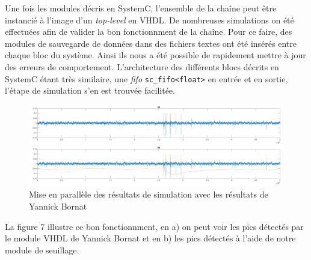 \documentclass[a4paper,12pt]{article}
\begin{document}
Une fois les modules décris en SystemC, l'ensemble de la chaîne peut être instancié à l'image d'un \textit{top-level} en VHDL. De nombreuses simulations on été effectuées afin de valider la bon fonctionnment de la chaîne. Pour ce faire, des modules de sauvegarde de données dans des fichiers textes ont été insérés entre chaque bloc du système. Ainsi ils nous a été possible de rapidement mettre à jour des erreurs de comportement. L'architecture des différents blocs décrits en SystemC étant très similaire, une \textit{fifo} \texttt{sc\_fifo<float>} en entrée et en sortie, l'étape de simulation s'en est trouvée facilitée.

\begin{figure}[H]
\centering
\includegraphics[scale =0.18, keepaspectratio]{results.png}
\caption{Mise en parallèle des résultats de simulation avec les résultats de Yannick Bornat}
\end{figure}
La figure 7 illustre ce bon fonctionnment, en a) on peut voir les pics détectés par le module VHDL de Yannick Bornat et en b) les pics détectés à l'aide de notre module de seuillage.
\end{document}
